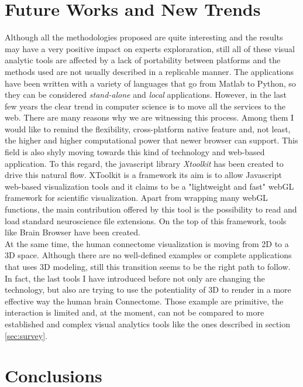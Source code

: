 \documentclass{article}
\begin{document}
\begin{multicols}{2}
\section{Future Works and New Trends}
\label{sec:futureWorks}
Although all the methodologies proposed are quite interesting and the results may have a very positive impact on experts exploraration, still all of these visual analytic tools are affected by a lack of portability between platforms and the methods used are not usually described in a replicable manner. The applications have been written with a variety of languages that go from Matlab to Python, so they can be considered \textit{stand-alone} and \textit{local} applications. However, in the last few years the clear trend in computer science is to move all the services to the web. There are many reasons why we are witnessing this process. Among them I would like to remind the flexibility, cross-platform native feature and, not least, the higher and higher computational power that newer browser can support. This field is also shyly moving towards this kind of technology and web-based application. To this regard, the javascript library \textit{Xtoolkit} \cite{xToolkit} has been created to drive this natural flow. XToolkit is a framework its aim is to allow Javascript web-based visualization tools and it claims to be a "lightweight and fast" webGL framework for scientific visualization. Apart from wrapping many webGL functions, the main contribution offered by this tool is the possibility to read and load standard neuroscience file extensions. On the top of this framework, tools like Brain Browser \cite{brainBrowser} have been created. \\

At the same time, the human connectome visualization is moving from 2D to a 3D space. Although there are no well-defined examples or complete applications that uses 3D modeling, still this transition seems to be the right path to follow. In fact, the last tools I have introduced before not only are changing the technology, but also are trying to use the potentiality of 3D to render in a more effective way the human brain Connectome. Those example are primitive, the interaction is limited and, at the moment, can not be compared to more established and complex visual analytics tools like the ones described in section \ref{sec:survey}.

\section{Conclusions}
\label{sec:conclusions}
{}
  





\end{multicols}
\end{document}
